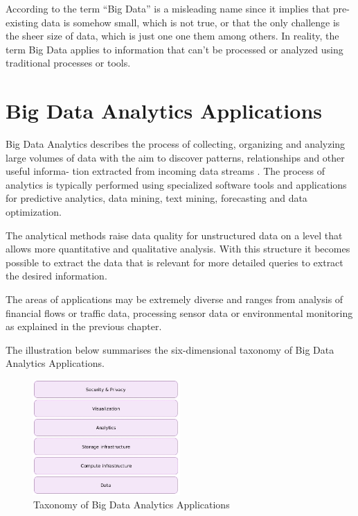 According to \cite{Marz15} the term “Big Data” is a misleading name since it implies that
pre-existing data is somehow small, which is not true, or that the only challenge is the
sheer size of data, which is just one one them among others. In reality, the term Big Data
applies to information that can’t be processed or analyzed using traditional processes or
tools.

\section{Big Data Analytics Applications}
Big Data Analytics describes the process of collecting, organizing and analyzing large
volumes of data with the aim to discover patterns, relationships and other useful informa-
tion extracted from incoming data streams \cite{Marz15}. The process of analytics is typically
performed using specialized software tools and applications for predictive analytics, data
mining, text mining, forecasting and data optimization.

The analytical methods raise data quality for unstructured data on a level that allows
more quantitative and qualitative analysis. With this structure it becomes possible
to extract the data that is relevant for more detailed queries to extract the desired information.

The areas of applications may be extremely diverse and ranges from analysis of financial
flows or traffic data, processing sensor data or environmental monitoring as explained in
the previous chapter.

The illustration below summarises the six-dimensional taxonomy \cite{Bitk14, Csa14} of Big
Data Analytics Applications.
\begin{figure}[H]
	\centering
	\includegraphics[width=0.5\textwidth]{../images/05-big-data-taxonomy.jpg}
	\caption{Taxonomy of Big Data Analytics Applications \cite{Bitk14, Csa14}}
	\label{taxonomy-bigdata-applications}
\end{figure}

